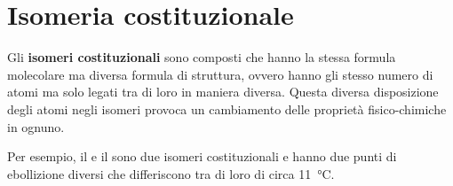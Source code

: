 \section{Isomeria costituzionale}
Gli \textbf{isomeri costituzionali} sono composti che hanno la stessa formula molecolare ma diversa formula di struttura, ovvero hanno gli stesso numero di atomi ma solo legati tra di loro in maniera diversa. Questa diversa disposizione degli atomi negli isomeri provoca un cambiamento delle proprietà fisico-chimiche in ognuno.

Per esempio, il  e il  sono due isomeri costituzionali e hanno due punti di ebollizione diversi che differiscono tra di loro di circa \qty{11}{\celsius}.